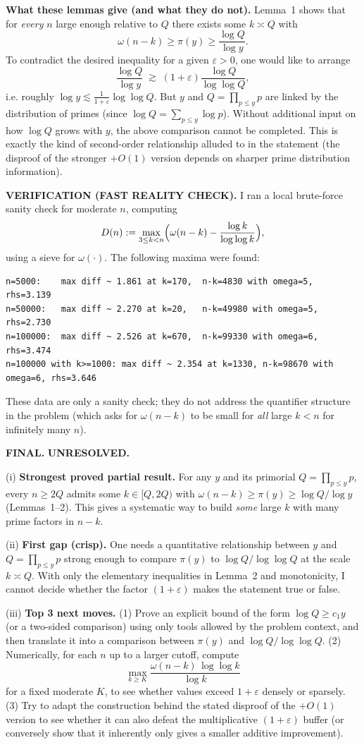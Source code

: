 \textbf{What these lemmas give (and what they do not).}
Lemma~1 shows that for \emph{every} $n$ large enough relative to $Q$ there exists some $k\asymp Q$ with
\[\omega(n-k)\ge\pi(y)\ge \frac{\log Q}{\log y}.
\]
To contradict the desired inequality for a given $\varepsilon>0$, one would like to arrange
\[\frac{\log Q}{\log y}\;\gtrsim\;(1+\varepsilon)\frac{\log Q}{\log\log Q},
\]
i.e. roughly $\log y\lesssim \frac{1}{1+\varepsilon}\log\log Q$.
But $y$ and $Q=\prod_{p\le y}p$ are linked by the distribution of primes (since $\log Q=\sum_{p\le y}\log p$). Without additional input on how $\log Q$ grows with $y$, the above comparison cannot be completed.
This is exactly the kind of second-order relationship alluded to in the statement (the disproof of the stronger $+O(1)$ version depends on sharper prime distribution information).

\textbf{VERIFICATION (FAST REALITY CHECK).}
I ran a local brute-force sanity check for moderate $n$, computing
\[D(n):=\max_{3\le k<n}\Bigl(\omega(n-k)-\frac{\log k}{\log\log k}\Bigr),\]
using a sieve for $\omega(\cdot)$. The following maxima were found:
\begin{verbatim}
n=5000:    max diff ~ 1.861 at k=170,  n-k=4830 with omega=5, rhs=3.139
n=50000:   max diff ~ 2.270 at k=20,   n-k=49980 with omega=5, rhs=2.730
n=100000:  max diff ~ 2.526 at k=670,  n-k=99330 with omega=6, rhs=3.474
n=100000 with k>=1000: max diff ~ 2.354 at k=1330, n-k=98670 with omega=6, rhs=3.646
\end{verbatim}
These data are only a sanity check; they do not address the quantifier structure in the problem (which asks for $\omega(n-k)$ to be small for \emph{all} large $k<n$ for infinitely many $n$).

\textbf{FINAL.}
\textbf{UNRESOLVED.}

(i) \textbf{Strongest proved partial result.}
For any $y$ and its primorial $Q=\prod_{p\le y}p$, every $n\ge 2Q$ admits some $k\in[Q,2Q)$ with $\omega(n-k)\ge\pi(y)\ge \log Q/\log y$ (Lemmas~1--2). This gives a systematic way to build \emph{some} large $k$ with many prime factors in $n-k$.

(ii) \textbf{First gap (crisp).}
One needs a quantitative relationship between $y$ and $Q=\prod_{p\le y}p$ strong enough to compare $\pi(y)$ to $\log Q/\log\log Q$ at the scale $k\asymp Q$. With only the elementary inequalities in Lemma~2 and monotonicity, I cannot decide whether the factor $(1+\varepsilon)$ makes the statement true or false.

(iii) \textbf{Top 3 next moves.}
(1) Prove an explicit bound of the form $\log Q\ge c_1 y$ (or a two-sided comparison) using only tools allowed by the problem context, and then translate it into a comparison between $\pi(y)$ and $\log Q/\log\log Q$.
(2) Numerically, for each $n$ up to a larger cutoff, compute
\[\max_{k\ge K} \frac{\omega(n-k)\,\log\log k}{\log k}
\]
for a fixed moderate $K$, to see whether values exceed $1+\varepsilon$ densely or sparsely.
(3) Try to adapt the construction behind the stated disproof of the $+O(1)$ version to see whether it can also defeat the multiplicative $(1+\varepsilon)$ buffer (or conversely show that it inherently only gives a smaller additive improvement).

